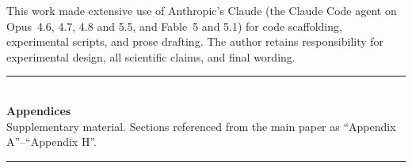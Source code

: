 \documentclass{article}
\begin{document}
\begin{ack}
This work made extensive use of Anthropic's Claude (the Claude Code agent on
Opus~4.6, 4.7, 4.8 and 5.5, and Fable~5 and 5.1) for code scaffolding, experimental scripts, and
prose drafting. The author retains responsibility for experimental design, all
scientific claims, and final wording.
\end{ack}



\appendix
\newpage
\begin{center}
  \rule{0.5\linewidth}{0.4pt}\\[0.6em]
  {\Large\bfseries Appendices}\\[0.25em]
  {\small Supplementary material. Sections referenced from the main
   paper as ``Appendix A''--``Appendix H''.}\\[0.4em]
  \rule{0.5\linewidth}{0.4pt}
\end{center}
\vspace{0.5em}









\end{document}
